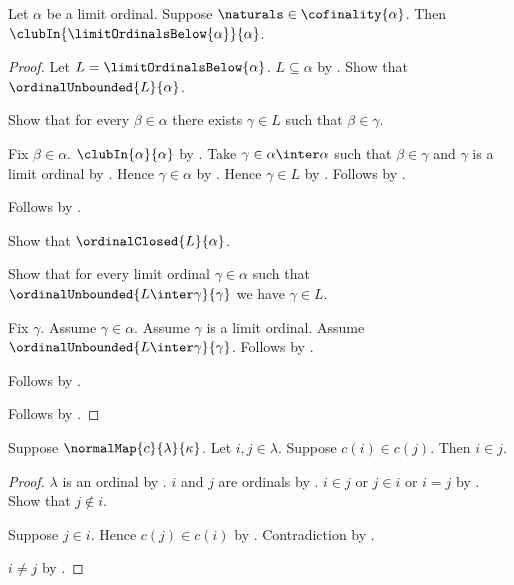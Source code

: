 \begin{theorem}\label{limit_ordinals_below_is_club}
    Let $\alpha$ be a limit ordinal.
    Suppose $\naturals\in\cofinality{\alpha}$.
    Then $\clubIn{\limitOrdinalsBelow{\alpha}}{\alpha}$.
\end{theorem}
\begin{proof}
    Let $L=\limitOrdinalsBelow{\alpha}$.
    $L\subseteq\alpha$ by .
    Show that $\ordinalUnbounded{L}{\alpha}$.
    \begin{subproof}
        Show that for every $\beta\in\alpha$ there exists $\gamma\in L$
            such that $\beta\in\gamma$.
        \begin{subproof}
            Fix $\beta\in\alpha$.
            $\clubIn{\alpha}{\alpha}$
                by .
            Take $\gamma\in\alpha\inter\alpha$ such that
                $\beta\in\gamma$ and $\gamma$ is a limit ordinal
                by .
            Hence $\gamma\in\alpha$ by .
            Hence $\gamma\in L$ by .
            Follows by \auto.
        \end{subproof}
        Follows by .
    \end{subproof}
    Show that $\ordinalClosed{L}{\alpha}$.
    \begin{subproof}
        Show that for every limit ordinal $\gamma\in\alpha$ such that
            $\ordinalUnbounded{L\inter\gamma}{\gamma}$
            we have $\gamma\in L$.
        \begin{subproof}
            Fix $\gamma$.
            Assume $\gamma\in\alpha$.
            Assume $\gamma$ is a limit ordinal.
            Assume $\ordinalUnbounded{L\inter\gamma}{\gamma}$.
            Follows by .
        \end{subproof}
        Follows by .
    \end{subproof}
    Follows by .
\end{proof}

\begin{proposition}\label{normal_map_reflects_order}
    Suppose $\normalMap{c}{\lambda}{\kappa}$.
    Let $i,j\in\lambda$.
    Suppose $c(i)\in c(j)$.
    Then $i\in j$.
\end{proposition}
\begin{proof}
    $\lambda$ is an ordinal by .
    $i$ and $j$ are ordinals by .
    $i\in j$ or $j\in i$ or $i=j$ by .
    Show that $j\notin i$.
    \begin{subproof}
        Suppose $j\in i$.
        Hence $c(j)\in c(i)$
            by .
        Contradiction by .
    \end{subproof}
    $i\neq j$ by .
\end{proof}


